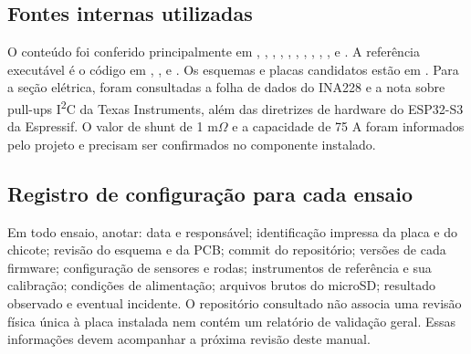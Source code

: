 \documentclass[11pt,a4paper,oneside]{report}
\begin{document}
\subsection{Fontes internas utilizadas}
O conteúdo foi conferido principalmente em , , , , , , , , , ,  e . A referência executável é o código em , ,  e . Os esquemas e placas candidatos estão em . Para a seção elétrica, foram consultadas a folha de dados do INA228 e a nota sobre pull-ups I\textsuperscript{2}C da Texas Instruments, além das diretrizes de hardware do ESP32-S3 da Espressif. O valor de shunt de 1 m$\Omega$ e a capacidade de 75 A foram informados pelo projeto e precisam ser confirmados no componente instalado.
\subsection{Registro de configuração para cada ensaio}
Em todo ensaio, anotar: data e responsável; identificação impressa da placa e do chicote; revisão do esquema e da PCB; commit do repositório; versões de cada firmware; configuração de sensores e rodas; instrumentos de referência e sua calibração; condições de alimentação; arquivos brutos do microSD; resultado observado e eventual incidente. O repositório consultado não associa uma revisão física única à placa instalada nem contém um relatório de validação geral. Essas informações devem acompanhar a próxima revisão deste manual.
\end{document}
